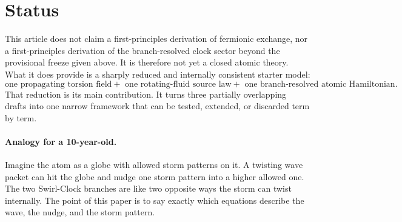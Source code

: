\documentclass[11pt,a4paper]{article}
\begin{document}
\section{Status}
This article does not claim a first-principles derivation of fermionic exchange, nor a first-principles derivation of the branch-resolved clock sector beyond the provisional freeze given above. It is therefore not yet a closed atomic theory. What it does provide is a sharply reduced and internally consistent starter model:
\begin{equation}
\boxed{
\text{one propagating torsion field}
+\text{ one rotating-fluid source law}
+\text{ one branch-resolved atomic Hamiltonian}.
}
\end{equation}
That reduction is its main contribution. It turns three partially overlapping drafts into one narrow framework that can be tested, extended, or discarded term by term.

\paragraph{Analogy for a 10-year-old.} Imagine the atom as a globe with allowed storm patterns on it. A twisting wave packet can hit the globe and nudge one storm pattern into a higher allowed one. The two Swirl-Clock branches are like two opposite ways the storm can twist internally. The point of this paper is to say exactly which equations describe the wave, the nudge, and the storm pattern.
\end{document}
